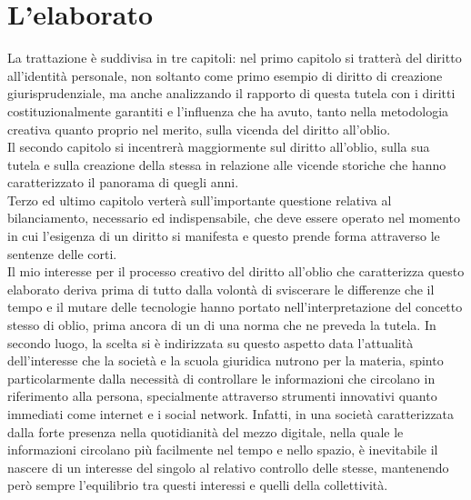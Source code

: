 \section{L'elaborato}
La trattazione è suddivisa in tre capitoli: nel primo capitolo si tratterà del diritto all'identità personale, non soltanto come primo esempio di diritto di creazione giurisprudenziale, ma anche analizzando il rapporto di questa tutela con i diritti costituzionalmente garantiti e l'influenza che ha avuto, tanto nella metodologia creativa quanto proprio nel merito, sulla vicenda del diritto all'oblio.
\\Il secondo capitolo si incentrerà maggiormente sul diritto all'oblio, sulla sua tutela e sulla creazione della stessa in relazione alle vicende storiche che hanno caratterizzato il panorama di quegli anni.
\\Terzo ed ultimo capitolo verterà sull'importante questione relativa al bilanciamento, necessario ed indispensabile, che deve essere operato nel momento in cui l'esigenza di un diritto si manifesta e questo prende forma attraverso le sentenze delle corti.
\\ Il mio interesse per il processo creativo del diritto all'oblio che caratterizza questo elaborato deriva prima di tutto dalla volontà di sviscerare le differenze che il tempo e il mutare delle tecnologie hanno portato nell'interpretazione del concetto stesso di oblio, prima ancora di un di una norma che ne preveda la tutela.
In secondo luogo, la scelta si è indirizzata su questo aspetto data l'attualità dell'interesse che la società e la scuola giuridica nutrono per la materia, spinto particolarmente dalla necessità di controllare le informazioni che circolano in riferimento alla persona, specialmente attraverso strumenti innovativi quanto immediati come internet e i social network.
Infatti, in una società caratterizzata dalla forte presenza nella quotidianità del mezzo digitale, nella quale le informazioni circolano più facilmente nel tempo e nello spazio, è inevitabile il nascere di un interesse del singolo al relativo controllo delle stesse, mantenendo però sempre l'equilibrio tra questi interessi e quelli della collettività.

